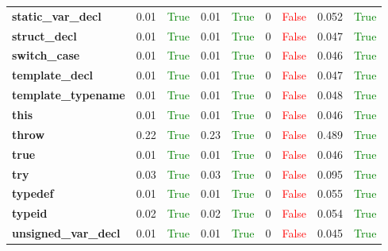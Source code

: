\documentclass{article}
\begin{document}
\begin{xltabular}{\textwidth}{lcccccccc}
\textbf{{\fontsize{10}{12}\selectfont static\_var\_decl}}& 0.01&\textcolor{green}{True}& 0.01&\textcolor{green}{True}& 0&\textcolor{red}{False}& 0.052&\textcolor{green}{True} \\[0.5ex]
\textbf{{\fontsize{10}{12}\selectfont struct\_decl}}& 0.01&\textcolor{green}{True}& 0.01&\textcolor{green}{True}& 0&\textcolor{red}{False}& 0.047&\textcolor{green}{True} \\[0.5ex]
\textbf{{\fontsize{10}{12}\selectfont switch\_case}}& 0.01&\textcolor{green}{True}& 0.01&\textcolor{green}{True}& 0&\textcolor{red}{False}& 0.046&\textcolor{green}{True} \\[0.5ex]
\textbf{{\fontsize{10}{12}\selectfont template\_decl}}& 0.01&\textcolor{green}{True}& 0.01&\textcolor{green}{True}& 0&\textcolor{red}{False}& 0.047&\textcolor{green}{True} \\[0.5ex]
\textbf{{\fontsize{10}{12}\selectfont template\_typename}}& 0.01&\textcolor{green}{True}& 0.01&\textcolor{green}{True}& 0&\textcolor{red}{False}& 0.048&\textcolor{green}{True} \\[0.5ex]
\textbf{{\fontsize{10}{12}\selectfont this}}& 0.01&\textcolor{green}{True}& 0.01&\textcolor{green}{True}& 0&\textcolor{red}{False}& 0.046&\textcolor{green}{True} \\[0.5ex]
\textbf{{\fontsize{10}{12}\selectfont throw}}& 0.22&\textcolor{green}{True}& 0.23&\textcolor{green}{True}& 0&\textcolor{red}{False}& 0.489&\textcolor{green}{True} \\[0.5ex]
\textbf{{\fontsize{10}{12}\selectfont true}}& 0.01&\textcolor{green}{True}& 0.01&\textcolor{green}{True}& 0&\textcolor{red}{False}& 0.046&\textcolor{green}{True} \\[0.5ex]
\textbf{{\fontsize{10}{12}\selectfont try}}& 0.03&\textcolor{green}{True}& 0.03&\textcolor{green}{True}& 0&\textcolor{red}{False}& 0.095&\textcolor{green}{True} \\[0.5ex]
\textbf{{\fontsize{10}{12}\selectfont typedef}}& 0.01&\textcolor{green}{True}& 0.01&\textcolor{green}{True}& 0&\textcolor{red}{False}& 0.055&\textcolor{green}{True} \\[0.5ex]
\textbf{{\fontsize{10}{12}\selectfont typeid}}& 0.02&\textcolor{green}{True}& 0.02&\textcolor{green}{True}& 0&\textcolor{red}{False}& 0.054&\textcolor{green}{True} \\[0.5ex]
\textbf{{\fontsize{10}{12}\selectfont unsigned\_var\_decl}}& 0.01&\textcolor{green}{True}& 0.01&\textcolor{green}{True}& 0&\textcolor{red}{False}& 0.045&\textcolor{green}{True} \\[0.5ex]

\end{xltabular}
\end{document}
